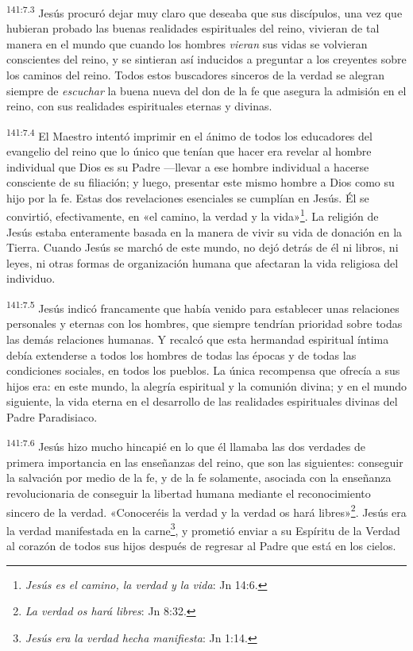 \par 
\textsuperscript{141:7.3} Jesús procuró dejar muy claro que deseaba que sus discípulos, una vez que hubieran probado las buenas realidades espirituales del reino, vivieran de tal manera en el mundo que cuando los hombres \textit{vieran} sus vidas se volvieran conscientes del reino, y se sintieran así inducidos a preguntar a los creyentes sobre los caminos del reino. Todos estos buscadores sinceros de la verdad se alegran siempre de \textit{escuchar} la buena nueva del don de la fe que asegura la admisión en el reino, con sus realidades espirituales eternas y divinas.

\par 
\textsuperscript{141:7.4} El Maestro intentó imprimir en el ánimo de todos los educadores del evangelio del reino que lo único que tenían que hacer era revelar al hombre individual que Dios es su Padre ---llevar a ese hombre individual a hacerse consciente de su filiación; y luego, presentar este mismo hombre a Dios como su hijo por la fe. Estas dos revelaciones esenciales se cumplían en Jesús. Él se convirtió, efectivamente, en «el camino, la verdad y la vida»\footnote{\textit{Jesús es el camino, la verdad y la vida}: Jn 14:6.}. La religión de Jesús estaba enteramente basada en la manera de vivir su vida de donación en la Tierra. Cuando Jesús se marchó de este mundo, no dejó detrás de él ni libros, ni leyes, ni otras formas de organización humana que afectaran la vida religiosa del individuo.

\par 
\textsuperscript{141:7.5} Jesús indicó francamente que había venido para establecer unas relaciones personales y eternas con los hombres, que siempre tendrían prioridad sobre todas las demás relaciones humanas. Y recalcó que esta hermandad espiritual íntima debía extenderse a todos los hombres de todas las épocas y de todas las condiciones sociales, en todos los pueblos. La única recompensa que ofrecía a sus hijos era: en este mundo, la alegría espiritual y la comunión divina; y en el mundo siguiente, la vida eterna en el desarrollo de las realidades espirituales divinas del Padre Paradisiaco.

\par 
\textsuperscript{141:7.6} Jesús hizo mucho hincapié en lo que él llamaba las dos verdades de primera importancia en las enseñanzas del reino, que son las siguientes: conseguir la salvación por medio de la fe, y de la fe solamente, asociada con la enseñanza revolucionaria de conseguir la libertad humana mediante el reconocimiento sincero de la verdad. «Conoceréis la verdad y la verdad os hará libres»\footnote{\textit{La verdad os hará libres}: Jn 8:32.}. Jesús era la verdad manifestada en la carne\footnote{\textit{Jesús era la verdad hecha manifiesta}: Jn 1:14.}, y prometió enviar a su Espíritu de la Verdad al corazón de todos sus hijos después de regresar al Padre que está en los cielos.

